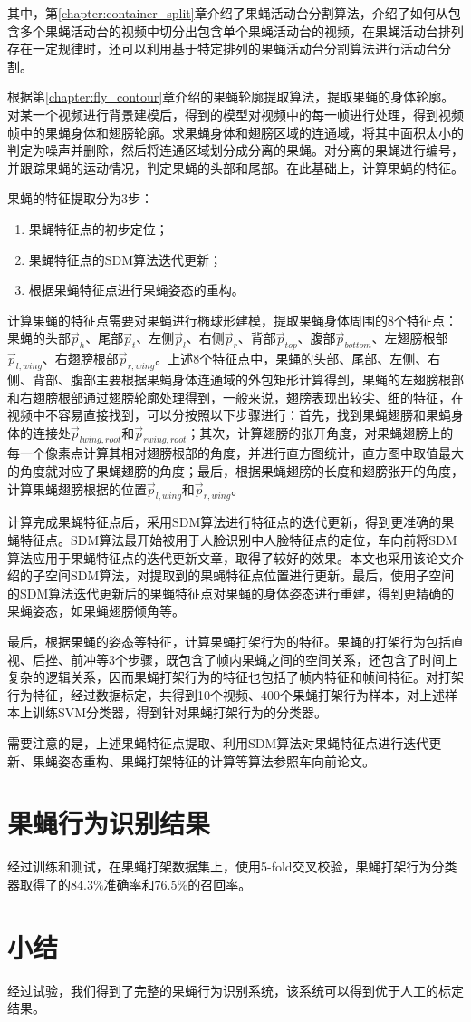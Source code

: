 其中，第\ref{chapter:container_split}章介绍了果蝇活动台分割算法，介绍了如何从包含多个果蝇活动台的视频中切分出包含单个果蝇活动台的视频，在果蝇活动台排列存在一定规律时，还可以利用基于特定排列的果蝇活动台分割算法进行活动台分割。

根据第\ref{chapter:fly_contour}章介绍的果蝇轮廓提取算法，提取果蝇的身体轮廓。对某一个视频进行背景建模后，得到的模型对视频中的每一帧进行处理，得到视频帧中的果蝇身体和翅膀轮廓。求果蝇身体和翅膀区域的连通域，将其中面积太小的判定为噪声并删除，然后将连通区域划分成分离的果蝇。对分离的果蝇进行编号，并跟踪果蝇的运动情况，判定果蝇的头部和尾部。在此基础上，计算果蝇的特征。

果蝇的特征提取分为3步\cite{chexiangqian}：
\begin{enumerate}
\item 果蝇特征点的初步定位；
\item 果蝇特征点的SDM算法迭代更新；
\item 根据果蝇特征点进行果蝇姿态的重构。
\end{enumerate}

计算果蝇的特征点需要对果蝇进行椭球形建模，提取果蝇身体周围的8个特征点：果蝇的头部$\vec{p}_{h}$、尾部$\vec{p}_{t}$、左侧$\vec{p}_{l}$、右侧$\vec{p}_{r}$、背部$\vec{p}_{top}$、腹部$\vec{p}_{bottom}$、左翅膀根部$\vec{p}_{l,wing}$、右翅膀根部$\vec{p}_{r,wing}$。上述8个特征点中，果蝇的头部、尾部、左侧、右侧、背部、腹部主要根据果蝇身体连通域的外包矩形计算得到，果蝇的左翅膀根部和右翅膀根部通过翅膀轮廓处理得到，一般来说，翅膀表现出较尖、细的特征，在视频中不容易直接找到，可以分按照以下步骤进行：首先，找到果蝇翅膀和果蝇身体的连接处$\vec{p}_{lwing,root}$和$\vec{p}_{rwing,root}$；其次，计算翅膀的张开角度，对果蝇翅膀上的每一个像素点计算其相对翅膀根部的角度，并进行直方图统计，直方图中取值最大的角度就对应了果蝇翅膀的角度；最后，根据果蝇翅膀的长度和翅膀张开的角度，计算果蝇翅膀根据的位置$\vec{p}_{l,wing}$和$\vec{p}_{r,wing}$。

计算完成果蝇特征点后，采用SDM算法进行特征点的迭代更新，得到更准确的果蝇特征点。SDM算法最开始被用于人脸识别中人脸特征点的定位，车向前将SDM算法应用于果蝇特征点的迭代更新文章\cite{chexiangqian}，取得了较好的效果。本文也采用该论文介绍的子空间SDM算法，对提取到的果蝇特征点位置进行更新。最后，使用子空间的SDM算法迭代更新后的果蝇特征点对果蝇的身体姿态进行重建，得到更精确的果蝇姿态，如果蝇翅膀倾角等。

最后，根据果蝇的姿态等特征，计算果蝇打架行为的特征。果蝇的打架行为包括直视、后挫、前冲等3个步骤，既包含了帧内果蝇之间的空间关系，还包含了时间上复杂的逻辑关系，因而果蝇打架行为的特征也包括了帧内特征和帧间特征\cite{chexiangqian}。对打架行为特征，经过数据标定，共得到10个视频、400个果蝇打架行为样本，对上述样本上训练SVM分类器，得到针对果蝇打架行为的分类器。

需要注意的是，上述果蝇特征点提取、利用SDM算法对果蝇特征点进行迭代更新、果蝇姿态重构、果蝇打架特征的计算等算法参照车向前论文\cite{chexiangqian}。

\section{果蝇行为识别结果}

经过训练和测试，在果蝇打架数据集上，使用5-fold交叉校验，果蝇打架行为分类器取得了的$84.3\%$准确率和$76.5\%$的召回率。

\section{小结}

经过试验，我们得到了完整的果蝇行为识别系统，该系统可以得到优于人工的标定结果。
